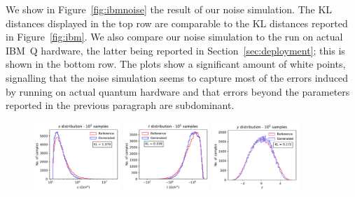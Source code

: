 \documentclass[twocolumn,preprintnumbers,superscriptaddress]{revtex4-2}
\begin{document}
We show in Figure~\ref{fig:ibmnoise} the result of our noise simulation. The KL distances displayed in the top row are comparable to the KL distances reported in Figure~\ref{fig:ibm}. We also compare our noise simulation to the run on actual IBM~Q hardware, the latter being reported in Section~\ref{sec:deployment}; this is shown in the bottom row. The plots show a significant amount of white points, signalling that the noise simulation seems to capture most of the errors induced by running on actual quantum hardware and that errors beyond the parameters reported in the previous paragraph are subdominant. 
\begin{figure}

  \includegraphics[width=0.29\textwidth]{plots/hardware_noise_simulation/s-distribution_LHCdata_100k_noise-simu.pdf}%
  \includegraphics[width=0.29\textwidth]{plots/hardware_noise_simulation/t-distribution_LHCdata_100k_noise-simu.pdf}%
  \includegraphics[width=0.29\textwidth]{plots/hardware_noise_simulation/y-distribution_LHCdata_100k_noise-simu.pdf}
  

\end{figure}
\end{document}
